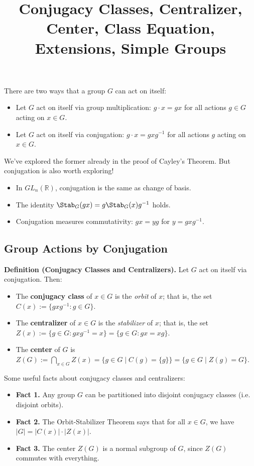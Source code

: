 \title{Conjugacy Classes, Centralizer, Center, Class Equation, Extensions, Simple Groups}



There are two ways that a group $G$ can act on itself:
\begin{itemize}
    \item Let $G$ act on itself via group multiplication: $g \cdot x = gx$ for all actions $g \in G$ acting on $x \in G$.
    \item Let $G$ act on itself via conjugation: $g \cdot x = gxg^{-1}$ for all actions $g$ acting on $x \in G$.
\end{itemize}
We've explored the former already in the proof of Cayley's Theorem.  But conjugation is also worth exploring!
\begin{itemize}
    \item In $GL_n(\mathbb{R})$, conjugation is the same as change of basis.
    \item The identity $\Stab_G(gx) = g\Stab_G(x)g^{-1}$ holds.
    \item Conjugation measures commutativity: $gx = yg$ for $y = gxg^{-1}$.
\end{itemize}

\subsection{Group Actions by Conjugation}

\textbf{Definition (Conjugacy Classes and Centralizers).} Let $G$ act on itself via conjugation.  Then:
\begin{itemize}
    \item The \textbf{conjugacy class} of $x \in G$ is the \emph{orbit} of $x$; that is, the set $C(x) := \{g x g^{-1} : g \in G\}$.
    \item The \textbf{centralizer} of $x \in G$ is the \emph{stabilizer} of $x$; that is, the set $Z(x) := \{g \in G: g xg^{-1} = x\} = \{g \in G: gx = xg\}$.
    \item The \textbf{center} of $G$ is $Z(G) := \bigcap_{x \in G} Z(x) = \{g \in G \mid C(g) = \{g\}\} = \{g \in G \mid Z(g) = G\}$.
\end{itemize}
Some useful facts about conjugacy classes and centralizers:
\begin{itemize}
    \item \textbf{Fact 1.} Any group $G$ can be partitioned into disjoint conjugacy classes (i.e. disjoint orbits).
    \item \textbf{Fact 2.} The Orbit-Stabilizer Theorem says that for all $x \in G$, we have $|G| = |C(x)| \cdot |Z(x)|$.
    \item \textbf{Fact 3.} The center $Z(G)$ is a normal subgroup of $G$, since $Z(G)$ commutes with everything.
\end{itemize}

